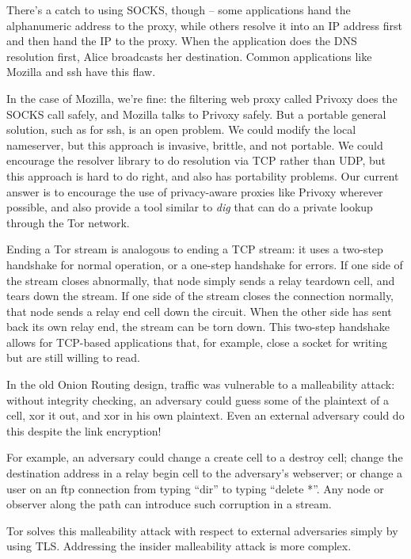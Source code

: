 \documentclass[times,10pt,twocolumn]{article}
\begin{document}
There's a catch to using SOCKS, though -- some applications hand the
alphanumeric address to the proxy, while others resolve it into an IP
address first and then hand the IP to the proxy. When the application
does the DNS resolution first, Alice broadcasts her destination. Common
applications like Mozilla and ssh have this flaw.

In the case of Mozilla, we're fine: the filtering web proxy called Privoxy
does the SOCKS call safely, and Mozilla talks to Privoxy safely. But a
portable general solution, such as for ssh, is an open problem. We could
modify the local nameserver, but this approach is invasive, brittle, and
not portable. We could encourage the resolver library to do resolution
via TCP rather than UDP, but this approach is hard to do right, and also
has portability problems. Our current answer is to encourage the use of
privacy-aware proxies like Privoxy wherever possible, and also provide
a tool similar to \emph{dig} that can do a private lookup through the
Tor network.

Ending a Tor stream is analogous to ending a TCP stream: it uses a
two-step handshake for normal operation, or a one-step handshake for
errors. If one side of the stream closes abnormally, that node simply
sends a relay teardown cell, and tears down the stream. If one side
of the stream closes the connection normally, that node sends a relay
end cell down the circuit. When the other side has sent back its own
relay end, the stream can be torn down. This two-step handshake allows
for TCP-based applications that, for example, close a socket for writing
but are still willing to read.


In the old Onion Routing design, traffic was vulnerable to a malleability
attack: without integrity checking, an adversary could
guess some of the plaintext of a cell, xor it out, and xor in his own
plaintext. Even an external adversary could do this despite the link
encryption!

For example, an adversary could change a create cell to a
destroy cell; change the destination address in a relay begin cell
to the adversary's webserver; or change a user on an ftp connection
from typing ``dir'' to typing ``delete *''. Any node or observer along
the path can introduce such corruption in a stream.

Tor solves this malleability attack with respect to external adversaries
simply by using TLS. Addressing the insider malleability attack is more
complex.
\end{document}
